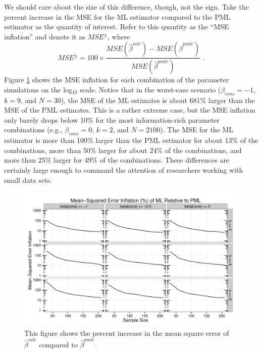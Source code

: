 \documentclass[12pt]{article}
\begin{document}
We should care about the size of this difference, though, not the sign.
Take the percent increase in the MSE for the ML estimator compared to the PML estimator as the quantity of interest. 
Refer to this quantity as the ``MSE inflation'' and denote it as $MSE^\Uparrow$, where 
\begin{equation}\label{eqn:mse-infl}
MSE^\Uparrow = 100 \times \dfrac{MSE(\hat{\beta}^{mle}) - MSE(\hat{\beta}^{pmle})}{MSE(\hat{\beta}^{pmle})}  \text{ .} 
\end{equation}
Figure \ref{fig:mse-infl} shows the MSE inflation for each combination of the parameter simulations on the log$_{10}$ scale. 
Notice that in the worst-case scenario ($\beta_{cons} = -1$, $k = 9$, and $N = 30$), the MSE of the ML estimates is about 681\% larger than the MSE of the PML estimates. 
This is a rather extreme case, but the MSE inflation only barely drops below 10\% for the most information-rich parameter combinations (e.g., $\beta_{cons} = 0$, $k = 2$, and $N = 2100$). 
The MSE for the ML estimator is more than 100\% larger than the PML estimator for about 13\% of the combinations, more than 50\% larger for about 24\% of the combinations, and more than 25\% larger for 49\% of the combinations. 
These differences are certainly large enough to command the attention of researchers working with small data sets.

\begin{figure}[h]
\begin{center}
\includegraphics[width = \textwidth]{figs/sims-mse-infl.pdf}
\caption{This figure shows the percent increase in the mean square error of $\hat{\beta}^{mle}$ compared to $\hat{\beta}^{pmle}$.}\label{fig:mse-infl}
\end{center}
\end{figure}
\end{document}
